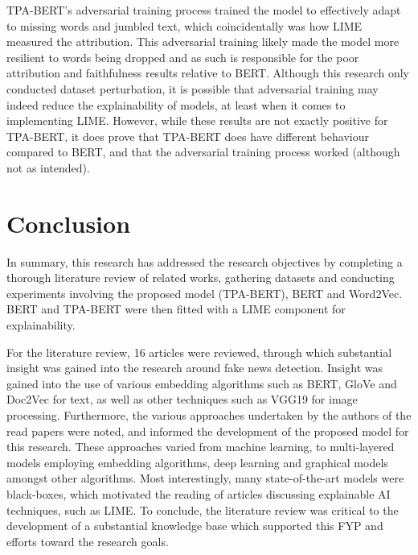 \documentclass[stu,12pt,floatsintext,donotrepeattitle]{apa7}
\begin{document}
TPA-BERT's adversarial training process trained the model to effectively adapt to missing words and jumbled text, which coincidentally was how LIME measured the attribution. This adversarial training likely made the model more resilient to words being dropped and as such is responsible for the poor attribution and faithfulness results relative to BERT. Although this research only conducted dataset perturbation, it is possible that adversarial training may indeed reduce the explainability of models, at least when it comes to implementing LIME. However, while these results are not exactly positive for TPA-BERT, it does prove that TPA-BERT does have different behaviour compared to BERT, and that the adversarial training process worked (although not as intended).


\clearpage
\section{Conclusion}
In summary, this research has addressed the research objectives by completing a thorough literature review of related works, gathering datasets and conducting experiments involving the proposed model (TPA-BERT), BERT and Word2Vec. BERT and TPA-BERT were then fitted with a LIME component for explainability. 

For the literature review, 16 articles were reviewed, through which substantial insight was gained into the research around fake news detection. Insight was gained into the use of various embedding algorithms such as BERT, GloVe and Doc2Vec for text, as well as other techniques such as VGG19 for image processing. Furthermore, the various approaches undertaken by the authors of the read papers were noted, and informed the development of the proposed model for this research. These approaches varied from machine learning, to multi-layered models employing embedding algorithms, deep learning and graphical models amongst other algorithms. Most interestingly, many state-of-the-art models were black-boxes, which motivated the reading of articles discussing explainable AI techniques, such as LIME. To conclude, the literature review was critical to the development of a substantial knowledge base which supported this FYP and efforts toward the research goals.
\end{document}

